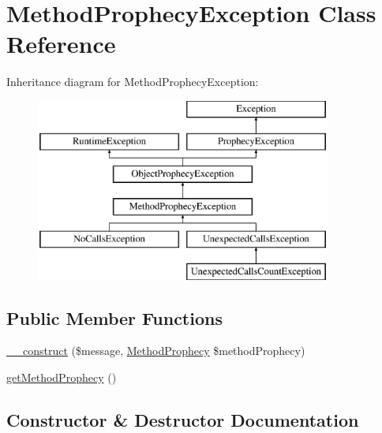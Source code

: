 \hypertarget{class_prophecy_1_1_exception_1_1_prophecy_1_1_method_prophecy_exception}{}\section{Method\+Prophecy\+Exception Class Reference}
\label{class_prophecy_1_1_exception_1_1_prophecy_1_1_method_prophecy_exception}
Inheritance diagram for Method\+Prophecy\+Exception\+:\begin{figure}[H]
\begin{center}
\leavevmode
\includegraphics[height=6.000000cm]{class_prophecy_1_1_exception_1_1_prophecy_1_1_method_prophecy_exception}
\end{center}
\end{figure}
\subsection*{Public Member Functions}
\begin{DoxyCompactItemize}
\item 
\mbox{\hyperlink{class_prophecy_1_1_exception_1_1_prophecy_1_1_method_prophecy_exception_a6698e0249aa09a7054761220e54de6cd}{\+\_\+\+\_\+construct}} (\$message, \mbox{\hyperlink{class_prophecy_1_1_prophecy_1_1_method_prophecy}{Method\+Prophecy}} \$method\+Prophecy)
\item 
\mbox{\hyperlink{class_prophecy_1_1_exception_1_1_prophecy_1_1_method_prophecy_exception_a9a864b8cd714331bdf5a91c471d30b05}{get\+Method\+Prophecy}} ()
\end{DoxyCompactItemize}


\subsection{Constructor \& Destructor Documentation}
\mbox{\label{class_prophecy_1_1_exception_1_1_prophecy_1_1_method_prophecy_exception_a6698e0249aa09a7054761220e54de6cd}} 
